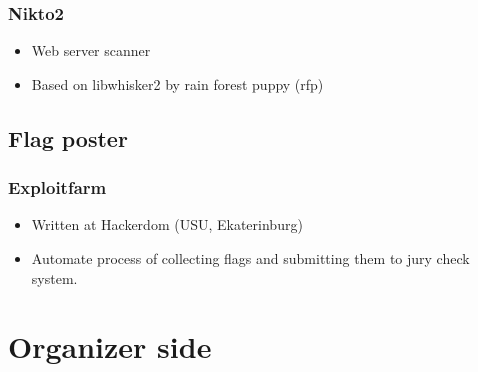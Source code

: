 \documentclass{beamer}
\begin{document}
\frame
{
\frametitle{Nikto2}
\begin{itemize}
\item Web server scanner
\item Based on libwhisker2 by rain forest puppy (rfp)
\end{itemize}
}

\subsection{Flag poster}
\frame
{
\frametitle{Exploitfarm}
\begin{itemize}
\item Written at Hackerdom (USU, Ekaterinburg)
\item Automate process of collecting flags and submitting them to jury check system.
\end{itemize}
}

\section{Organizer side}
\end{document}
